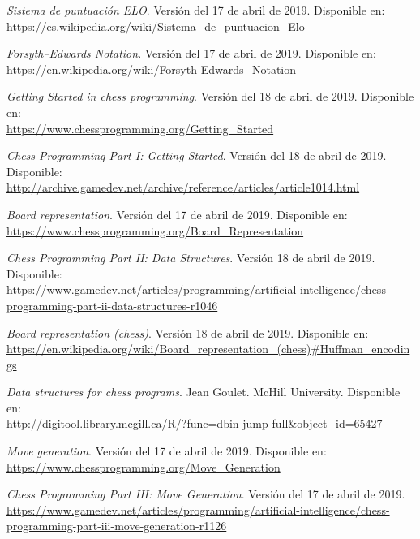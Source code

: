 \documentclass[letterpaper,12pt]{article}
\begin{document}
\begin{thebibliography}{99}
\textit{Sistema de puntuación ELO}. Versión del 17 de abril de 2019. Disponible en: \\
\url{https://es.wikipedia.org/wiki/Sistema_de_puntuacion_Elo}

\textit{Forsyth–Edwards Notation}. Versión del 17 de abril de 2019. Disponible en: \\
\url{https://en.wikipedia.org/wiki/Forsyth-Edwards_Notation}

\textit{Getting Started in chess programming}. Versión del 18 de abril de 2019. 
Disponible en: \\
\url{https://www.chessprogramming.org/Getting_Started}

\textit{Chess Programming Part I: Getting Started}. Versión del 18 de abril de 2019. 
Disponible: \\
\url{http://archive.gamedev.net/archive/reference/articles/article1014.html}

\textit{Board representation}. Versión del 17 de abril de 2019. Disponible en: \\
\url{https://www.chessprogramming.org/Board_Representation}

\textit{Chess Programming Part II: Data Structures}. Versión 18 de abril de 2019. 
Disponible: \\
\url{https://www.gamedev.net/articles/programming/artificial-intelligence/chess-programming-part-ii-data-structures-r1046}

\textit{Board representation (chess)}. Versión 18 de abril de 2019. Disponible en: \\
\url{https://en.wikipedia.org/wiki/Board_representation_(chess)#Huffman_encodings}

\textit{Data structures for chess programs}. Jean Goulet. McHill University. Disponible 
en: \\ \url{http://digitool.library.mcgill.ca/R/?func=dbin-jump-full&object_id=65427}

\textit{Move generation}. Versión del 17 de abril de 2019. Disponible en: \\
\url{https://www.chessprogramming.org/Move_Generation}

\textit{Chess Programming Part III: Move Generation}. Versión del 17 de abril de 2019.
\\ \url{https://www.gamedev.net/articles/programming/artificial-intelligence/chess-programming-part-iii-move-generation-r1126}


\end{thebibliography}
\end{document}
